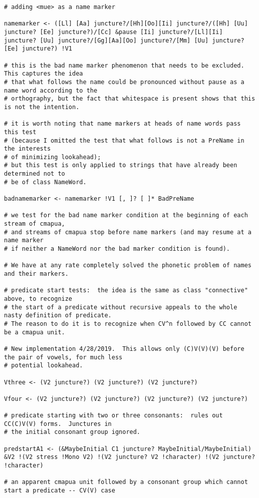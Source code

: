\documentclass{article}
\begin{document}
\begin{verbatim}
# adding <mue> as a name marker

namemarker <- ([Ll] [Aa] juncture?/[Hh][Oo][Ii] juncture?/([Hh] [Uu] juncture? [Ee] juncture?)/[Cc] &pause [Ii] juncture?/[Ll][Ii] juncture? [Uu] juncture?/[Gg][Aa][Oo] juncture?/[Mm] [Uu] juncture? [Ee] juncture?) !V1

# this is the bad name marker phenomenon that needs to be excluded.  This captures the idea
# that what follows the name could be pronounced without pause as a name word according to the
# orthography, but the fact that whitespace is present shows that this is not the intention.

# it is worth noting that name markers at heads of name words pass this test
# (because I omitted the test that what follows is not a PreName in the interests
# of minimizing lookahead);
# but this test is only applied to strings that have already been determined not to
# be of class NameWord.

badnamemarker <- namemarker !V1 [, ]? [ ]* BadPreName

# we test for the bad name marker condition at the beginning of each stream of cmapua,
# and streams of cmapua stop before name markers (and may resume at a name marker
# if neither a NameWord nor the bad marker condition is found).

# We have at any rate completely solved the phonetic problem of names and their markers.

# predicate start tests:  the idea is the same as class "connective" above, to recognize
# the start of a predicate without recursive appeals to the whole nasty definition of predicate.
# The reason to do it is to recognize when CV^n followed by CC cannot be a cmapua unit.

# New implementation 4/28/2019.  This allows only (C)V(V)(V) before the pair of vowels, for much less
# potential lookahead.

Vthree <- (V2 juncture?) (V2 juncture?) (V2 juncture?)

Vfour <- (V2 juncture?) (V2 juncture?) (V2 juncture?) (V2 juncture?)

# predicate starting with two or three consonants:  rules out CC(C)V(V) forms.  Junctures in
# the initial consonant group ignored.

predstartA1 <- (&MaybeInitial C1 juncture? MaybeInitial/MaybeInitial) &V2 !(V2 stress !Mono V2) !(V2 juncture? V2 !character) !(V2 juncture? !character)

# an apparent cmapua unit followed by a consonant group which cannot start a predicate -- CV(V) case


\end{verbatim}
\end{document}
